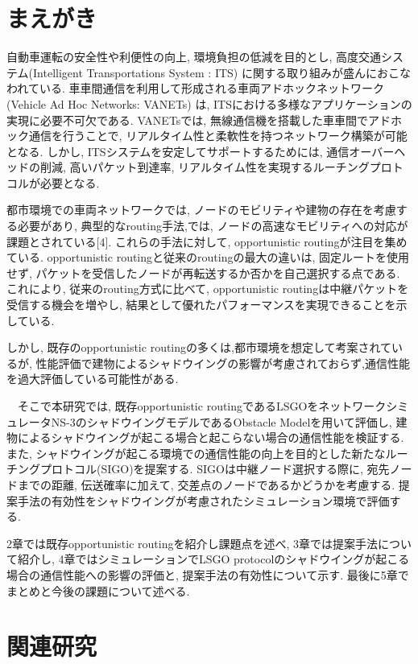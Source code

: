 \documentclass[technicalreport]{ieicej}
\begin{document}
\section{まえがき}


自動車運転の安全性や利便性の向上, 環境負担の低減を目的とし, 高度交通システム(Intelligent Transportations System : ITS) \cite{ITS} に関する取り組みが盛んにおこなわれている. 車車間通信を利用して形成される車両アドホックネットワーク(Vehicle Ad Hoc Networks: VANETs) は, ITSにおける多様なアプリケーションの実現に必要不可欠である. VANETsでは, 無線通信機を搭載した車車間でアドホック通信を行うことで, リアルタイム性と柔軟性を持つネットワーク構築が可能となる. しかし,  ITSシステムを安定してサポートするためには, 通信オーバーヘッドの削減, 高いパケット到達率, リアルタイム性を実現するルーチングプロトコルが必要となる. \par
 都市環境での車両ネットワークでは, ノードのモビリティや建物の存在を考慮する必要があり, 典型的なrouting手法\cite{Old1},\cite{Old2}では, ノードの高速なモビリティへの対応が課題とされている[4]. これらの手法に対して, opportunistic routingが注目を集めている\cite{EXOR}. opportunistic routingと従来のroutingの最大の違いは, 固定ルートを使用せず, パケットを受信したノードが再転送するか否かを自己選択する点である. これにより, 従来のrouting方式に比べて, opportunistic routingは中継パケットを受信する機会を増やし, 結果として優れたパフォーマンスを実現できることを示している.\par
 しかし, 既存のopportunistic routingの多くは,都市環境を想定して考案されているが, 性能評価で建物によるシャドウイングの影響が考慮されておらず,通信性能を過大評価している可能性がある.
 
　そこで本研究では, 既存opportunistic routingであるLSGO\cite{LSGO}をネットワークシミュレータNS-3のシャドウイングモデルであるObstacle Model\cite{Obstacle}を用いて評価し, 建物によるシャドウイングが起こる場合と起こらない場合の通信性能を検証する. また, シャドウイングが起こる環境での通信性能の向上を目的とした新たなルーチングプロトコル(SIGO)を提案する. SIGOは中継ノード選択する際に, 宛先ノードまでの距離, 伝送確率に加えて, 交差点のノードであるかどうかを考慮する. 提案手法の有効性をシャドウイングが考慮されたシミュレーション環境で評価する.\par
 2章では既存opportunistic routingを紹介し課題点を述べ, 3章では提案手法について紹介し, 4章ではシミュレーションでLSGO protocolのシャドウイングが起こる場合の通信性能への影響の評価と, 提案手法の有効性について示す. 最後に5章でまとめと今後の課題について述べる.


\section{関連研究}
\end{document}
